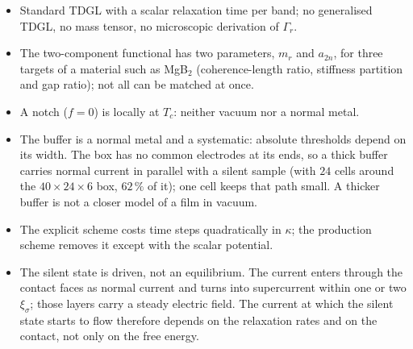 \documentclass[11pt,a4paper]{article}
\begin{document}
\begin{itemize}
\item Standard TDGL with a scalar relaxation time per band; no generalised
  TDGL, no mass tensor, no microscopic derivation of $\Gamma_r$.
\item The two-component functional has two parameters, $m_r$ and $a_{2n}$,
  for three targets of a material such as MgB$_2$ (coherence-length ratio,
  stiffness partition and gap ratio); not all can be matched at once.
\item A notch ($f=0$) is locally at $T_c$: neither vacuum nor a normal metal.
\item The buffer is a normal metal and a systematic: absolute thresholds depend on its width. The
  box has no common electrodes at its ends, so a thick buffer carries normal current in parallel with
  a silent sample (with $24$ cells around the $40\times24\times6$ box, $62\,\%$ of it); one cell keeps
  that path small. A thicker buffer is not a closer model of a film in vacuum.
\item The explicit scheme costs time steps quadratically in $\kappa$; the
  production scheme removes it except with the scalar potential.
\item The silent state is driven, not an equilibrium. The current enters
  through the contact faces as normal current and turns into supercurrent
  within one or two $\xi_\sigma$; those layers carry a steady electric field.
  The current at which the silent state starts to flow therefore depends on
  the relaxation rates and on the contact, not only on the free energy.
\end{itemize}
\end{document}
